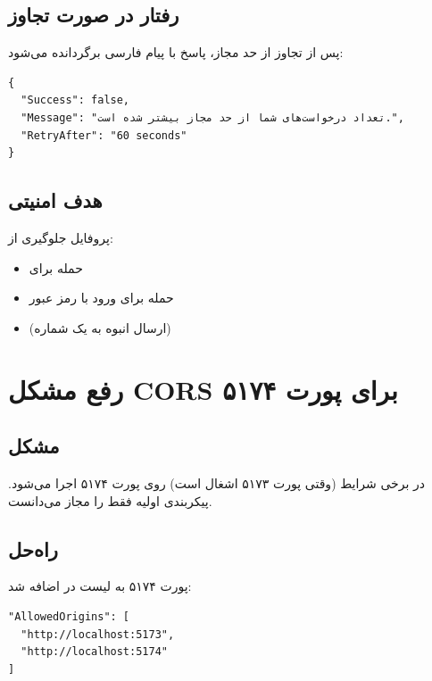 \documentclass[12pt, a4paper]{article}
\begin{document}
\subsection{رفتار در صورت تجاوز}
پس از تجاوز از حد مجاز، پاسخ  با پیام فارسی برگردانده می‌شود:

\begin{latin}
\begin{verbatim}
{
  "Success": false,
  "Message": "تعداد درخواست‌های شما از حد مجاز بیشتر شده است.",
  "RetryAfter": "60 seconds"
}
\end{verbatim}
\end{latin}

\subsection{هدف امنیتی}
پروفایل  جلوگیری از:
\begin{itemize}[rightmargin=0.5cm]
  \item حمله  برای 
  \item حمله  برای ورود با رمز عبور
  \item {} (ارسال انبوه  به یک شماره)
\end{itemize}

\newpage

\section{رفع مشکل CORS برای پورت ۵۱۷۴}

\subsection{مشکل}
 در برخی شرایط (وقتی پورت ۵۱۷۳ اشغال است) روی پورت ۵۱۷۴ اجرا می‌شود.
پیکربندی  اولیه فقط  را مجاز می‌دانست.

\subsection{راه‌حل}
پورت ۵۱۷۴ به لیست  در  اضافه شد:

\begin{latin}
\begin{verbatim}
"AllowedOrigins": [
  "http://localhost:5173",
  "http://localhost:5174"
]
\end{verbatim}
\end{latin}
\end{document}
